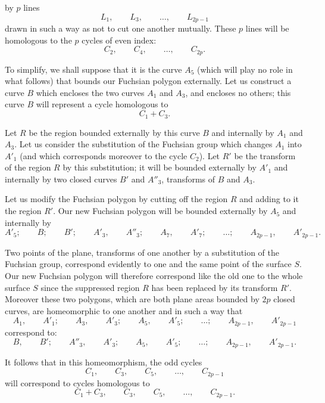 \documentclass{article}
\begin{document}
by $p$ lines
\[ L_{1}, \qquad L_{3}, \qquad \ldots, \qquad L_{2p-1} \]
drawn in such a way as not to cut one another mutually. These $p$ lines will be homologous to the $p$ cycles of even index:
\[ C_{2}, \qquad C_{4}, \qquad \ldots, \qquad C_{2p}. \]

To simplify, we shall suppose that it is the curve $A_{5}$ (which will play no role in what follows) that bounds our Fuchsian polygon externally. Let us construct a curve $B$ which encloses the two curves $A_{1}$ and $A_{3}$, and encloses no others; this curve $B$ will represent a cycle homologous to
\[ C_{1} + C_{3}. \]

Let $R$ be the region bounded externally by this curve $B$ and internally by $A_{1}$ and $A_{3}$. Let us consider the substitution of the Fuchsian group which changes $A_{1}$ into $A'_{1}$ (and which corresponds moreover to the cycle $C_{2}$). Let $R'$ be the transform of the region $R$ by this substitution; it will be bounded externally by $A'_{1}$ and internally by two closed curves $B'$ and $A''_{3}$, transforms of $B$ and $A_{3}$.

Let us modify the Fuchsian polygon by cutting off the region $R$ and adding to it the region $R'$. Our new Fuchsian polygon will be bounded externally by $A_{5}$ and internally by
\[ A'_{5}; \qquad B; \qquad B'; \qquad A'_{3}, \qquad A''_{3}; \qquad A_{7}, \qquad A'_{7}; \qquad \ldots; \qquad A_{2p-1}, \qquad A'_{2p-1}. \]

Two points of the plane, transforms of one another by a substitution of the Fuchsian group, correspond evidently to one and the same point of the surface $S$. Our new Fuchsian polygon will therefore correspond like the old one to the whole surface $S$ since the suppressed region $R$ has been replaced by its transform $R'$. Moreover these two polygons, which are both plane areas bounded by $2p$ closed curves, are homeomorphic to one another and in such a way that
\[ A_{1}, \qquad A'_{1}; \qquad A_{3}, \qquad A'_{3}; \qquad A_{5}, \qquad A'_{5}; \qquad \ldots; \qquad A_{2p-1}, \qquad A'_{2p-1} \]
correspond to:
\[ B, \qquad B'; \qquad A''_{3}, \qquad A'_{3}; \qquad A_{5}, \qquad A'_{5}; \qquad \ldots; \qquad A_{2p-1}, \qquad A'_{2p-1}. \]

It follows that in this homeomorphism, the odd cycles
\[ C_{1}, \qquad C_{3}, \qquad C_{5}, \qquad \ldots, \qquad C_{2p-1} \]
will correspond to cycles homologous to
\[ C_{1} + C_{3}, \qquad C_{3}, \qquad C_{5}, \qquad \ldots, \qquad C_{2p-1}. \]

\end{document}

